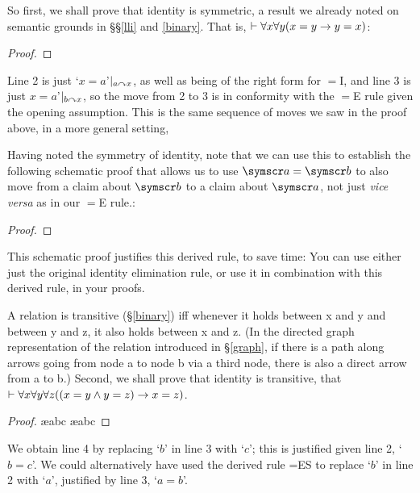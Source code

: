  So first, we shall prove that identity is symmetric, a result we already noted on semantic grounds in §§\ref{lli} and \ref{binary}. That is, $\vdash \forall x \forall y (x = y \rightarrow y = x)$:
\begin{proof}
	\open
		\idi{}
	\close
\end{proof}
Line 2 is just `$x=a$'$\vert_{a\curvearrowright x}$, as well as being of the right form for $=$I, and line 3 is just $x=a$'$\vert_{b\curvearrowright x}$, so the move from 2 to 3 is in conformity with the $=$E rule given the opening assumption. This is the same sequence of moves we saw in the proof above, in a more general setting,

Having noted the symmetry of identity, note that we can use this to establish the following schematic proof that allows us to use $\meta{a}=\meta{b}$ to also move from a claim about $\meta{b}$ to a claim about $\meta{a}$, not just \emph{vice versa} as in our $=$E rule.:
\begin{proof}
	\idi{}
	 
\end{proof} This schematic proof justifies this derived rule, to save time:\label{id.es}  You can use either just the original identity elimination rule, or use it in combination with this derived rule, in your proofs.


A relation is transitive (§\ref{binary}) iff whenever it holds between x and y and between y and z, it also holds between x and z. (In the directed graph representation of the relation introduced in §\ref{graph}, if there is a path along arrows going from node a to node b via a third node, there is also a direct arrow from a to b.) Second, we shall prove that identity is transitive, that $\vdash \forall x \forall y \forall z((x = y \wedge y = z) \rightarrow x = z)$.
\begin{proof}
	\open
		\ae{abc}
		\ae{abc}
	\close
\end{proof}
We obtain line 4 by replacing `$b$' in line 3 with `$c$'; this is justified given line 2, `$b=c$'. We could alternatively have used the derived rule =ES to replace `$b$' in line 2 with `$a$', justified by line 3, `$a=b$'. 

